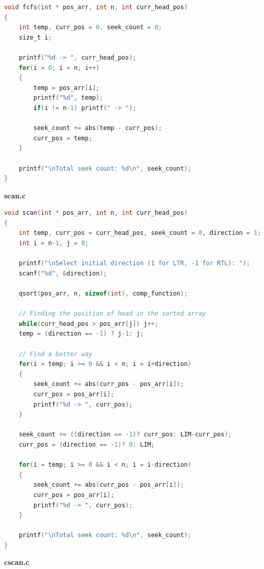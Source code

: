 \documentclass[13pt,oneside]{book}
\begin{document}
\begin{lstlisting}[language=C]
void fcfs(int * pos_arr, int n, int curr_head_pos)
{
	int temp, curr_pos = 0, seek_count = 0;
	size_t i;

	printf("%d -> ", curr_head_pos);
	for(i = 0; i < n; i++)
	{
		temp = pos_arr[i];
		printf("%d", temp);
		if(i != n-1) printf(" -> ");

		seek_count += abs(temp - curr_pos);
		curr_pos = temp;
	}

	printf("\nTotal seek count: %d\n", seek_count);
}
    \end{lstlisting}
    
        \Large\textbf{scan.c}
\small

\begin{lstlisting}[language=C]
void scan(int * pos_arr, int n, int curr_head_pos)
{
	int temp, curr_pos = curr_head_pos, seek_count = 0, direction = 1;
	int i = n-1, j = 0;

	printf("\nSelect initial direction (1 for LTR, -1 for RTL): ");
	scanf("%d", &direction);

	qsort(pos_arr, n, sizeof(int), comp_function);
	
	// Finding the position of head in the sorted array
	while(curr_head_pos > pos_arr[j]) j++;
	temp = (direction == -1) ? j-1: j;

	// Find a better way
	for(i = temp; i >= 0 && i < n; i = i+direction) 
	{
		seek_count += abs(curr_pos - pos_arr[i]);
		curr_pos = pos_arr[i];
		printf("%d -> ", curr_pos);
	}

	seek_count += ((direction == -1)? curr_pos: LIM-curr_pos);
	curr_pos = (direction == -1)? 0: LIM;

	for(i = temp; i >= 0 && i < n; i = i-direction)
	{
		seek_count += abs(curr_pos - pos_arr[i]);
		curr_pos = pos_arr[i];
		printf("%d -> ", curr_pos);
	}

	printf("\nTotal seek count: %d\n", seek_count);
}
    \end{lstlisting}
        \Large\textbf{cscan.c}
\small
\end{document}
